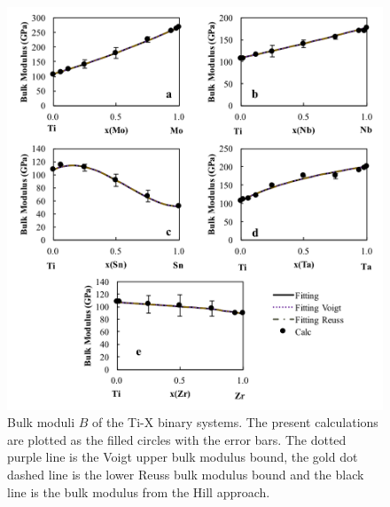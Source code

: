 \pagebreak
\begin{figure}[H]
	\centering
	\includegraphics[width=\textwidth]{Chapter-5/Figures/tixbulk.png}
	\caption{Bulk moduli $B$ of the Ti-X binary systems. The present calculations are plotted as the filled circles with the error bars. The dotted purple line is the Voigt upper bulk modulus bound, the gold dot dashed line is the lower Reuss bulk modulus bound and the black line is the bulk modulus from the Hill approach.}
	\label{Ch5-figure:tixbulk}
\end{figure}

